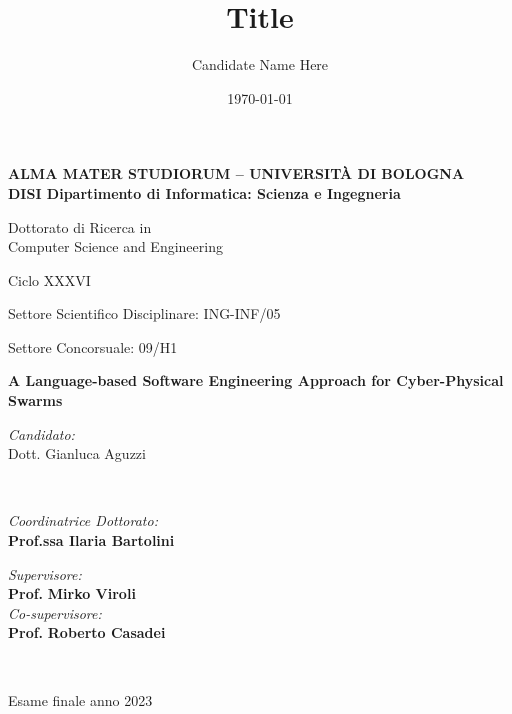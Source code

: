 \title{Title}
\author{Candidate Name Here}
\date{\today}

\begin{titlepage}
	\begin{center}
		
		\large
		\textbf{ALMA MATER STUDIORUM -- UNIVERSITÀ DI BOLOGNA \\ DISI Dipartimento di Informatica: Scienza e Ingegneria}
		\\
		\noindent\hrulefill
		\vspace{0.4cm}
		
		\Large
		Dottorato di Ricerca in \\
		Computer Science and Engineering

		\vspace{0.4cm}

		Ciclo XXXVI

		\vspace{0.4cm}

		Settore Scientifico Disciplinare: ING-INF/05
		
		Settore Concorsuale: 09/H1
		
		\Huge
		\vspace{3cm}
		\textbf{
			A Language-based Software Engineering Approach for Cyber-Physical Swarms
		}
		
		{\Large{
		\vspace{3cm}
		
		\textit{Candidato:\\}
		\centering
		Dott. Gianluca Aguzzi}
		\\}
		\large
		\vspace{2.5cm}
		\begin{minipage}[t]{0.64\textwidth}
			\begin{flushleft}
				\textit{Coordinatrice Dottorato:} 
				\\ 
				\textbf{Prof.ssa Ilaria Bartolini}
			\end{flushleft}
		\end{minipage}
		\begin{minipage}[t]{0.34\textwidth}
			\begin{flushright}
				\textit{Supervisore:} 
				\\ 
				\textbf{Prof.} \textbf{Mirko Viroli}
				\\
				\vspace{0.4cm}
				\textit{Co-supervisore:} 
				\\
				\textbf{Prof.} \textbf{Roberto Casadei}
			\end{flushright}
		
		\end{minipage}\\
		
		\vfill
		\noindent\hrulefill
		\vspace{0.3cm}
		\Large

		Esame finale anno 2023
	\end{center}
\end{titlepage}
\restoregeometry
